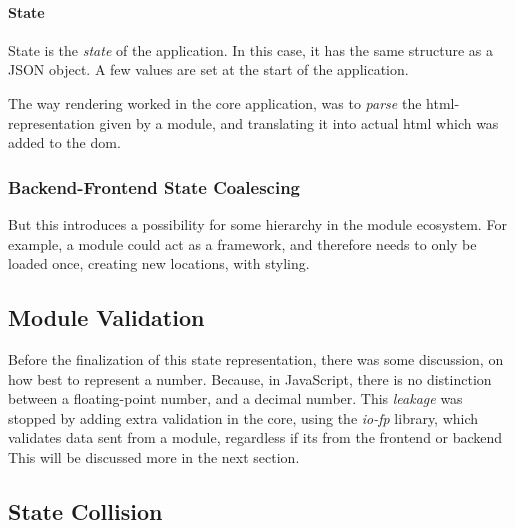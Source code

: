 
\paragraph{State}
State is the \textit{state} of the application. In this case, it has the same
structure as a JSON object. A few values are set at the start of the
application.

The way rendering worked in the core application, was to \textit{parse} the
\gls{html}-representation given by a module, and translating it into actual
\gls{html} which was added to the \gls{dom}.

\subsubsection{Backend-Frontend State Coalescing}


But this introduces a possibility for some hierarchy in the module ecosystem.
For example, a module could act as a framework, and therefore needs to only be
loaded once, creating new locations, with styling.

\subsection{Module Validation}



Before the finalization of this state representation, there was some
discussion, on how best to represent a number. Because, in JavaScript, there is
no distinction between a floating-point number, and a decimal number. This
\textit{leakage} was stopped by adding extra validation in the core, using the
\textit{io-fp} library, which validates data sent from a module, regardless if
its from the frontend or backend This will be discussed more in the next
section.

\subsection{State Collision} \label{sec:collision}

